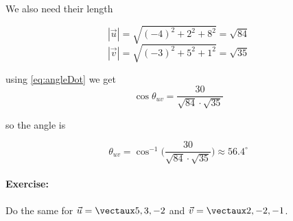 \documentclass{article}
\begin{document}
We also need their length

\[
|\vec{u}| = \sqrt{(-4)^2+2^2+8^2} = \sqrt{84} 
\]
\[
|\vec{v}| = \sqrt{(-3)^2+5^2+1^2} = \sqrt{35} 
\]

using \eqref{eq:angleDot} we get
\[
\cos \theta_{uv} = \frac{30}{\sqrt{84}\cdot\sqrt{35}}
\]

so the angle is

\[
\theta_{uv} = \cos^{-1} \bigg( \frac{30}{\sqrt{84}\cdot\sqrt{35}}\bigg) \approx 56.4^\circ
\]



\paragraph{Exercise:} Do the same for $\vec{u}=\vect{5,3,-2}$ and $\vec{v}=\vect{2,-2,-1}$.
\end{document}
